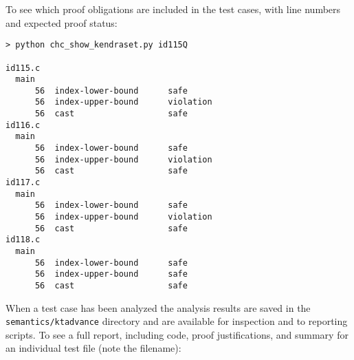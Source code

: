 \documentclass[11pt]{article}
\begin{document}
To see which proof obligations are included in the test cases, with line numbers and
expected proof status:
\begin{verbatim}
> python chc_show_kendraset.py id115Q

id115.c
  main
      56  index-lower-bound      safe                                                 
      56  index-upper-bound      violation                                            
      56  cast                   safe                                                 
id116.c
  main
      56  index-lower-bound      safe                                                 
      56  index-upper-bound      violation                                            
      56  cast                   safe                                                 
id117.c
  main
      56  index-lower-bound      safe                                                 
      56  index-upper-bound      violation                                            
      56  cast                   safe                                                 
id118.c
  main
      56  index-lower-bound      safe                                                 
      56  index-upper-bound      safe                                                 
      56  cast                   safe 
\end{verbatim} 
When a test case has been analyzed the analysis results are saved in the 
{\tt semantics/ktadvance} directory and are available for inspection and to
reporting scripts.
To see a full report, including code, proof justifications, and summary for an individual
test file (note the filename):
\end{document}
